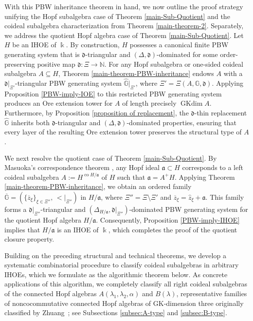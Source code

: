 \documentclass{article}
\theoremstyle{plain}
\theoremstyle{definition}
\numberwithin{equation}{section}
\newcommand{\GG}{\mathbb{G}}
\newcommand{\dd}{\mathfrak{d}}
\begin{document}
	With this PBW inheritance theorem in hand, we now outline the proof strategy unifying the Hopf subalgebra case of Theorem \ref{main-Sub-Quotient} and the coideal subalgebra characterization from Theorem \ref{main-theorem-2}. Separately, we address the quotient Hopf algebra case of Theorem \ref{main-Sub-Quotient}. Let $H$ be an IHOE of $\Bbbk$. By construction, $H$ possesses a canonical finite PBW generating system that is $\dd$-triangular and $(\Delta,\dd)$-dominated for some order-preserving positive map $\dd\colon \Xi\to \mathbb{N}$. For any Hopf subalgebra or one-sided coideal subalgebra $A\subseteq H$, Theorem \ref{main-theorem-PBW-inheritance} endows $A$ with a $\dd|_{\Xi'}$-triangular PBW generating system $\hat{\GG}|_{\Xi'}$, where $\Xi'=\Xi(A,\GG,\dd)$. Applying Proposition \ref{PBW-imply-IOE} to this restricted PBW generating system produces an Ore extension tower for $A$ of length precisely $\operatorname{GKdim} A$. Furthermore, by Proposition \ref{proposition of replacement}, the $\dd$-thin replacement $\hat{\GG}$ inherits both $\dd$-triangular and $(\Delta,\dd)$-dominated properties, ensuring that every layer of the resulting Ore extension tower preserves the structural type of $A$. 
	
	We next resolve the quotient case of Theorem \ref{main-Sub-Quotient}. By Masuoka’s correspondence theorem \cite{Ma91}, any Hopf ideal $\mathfrak{a} \subset H$ corresponds to a left coideal subalgebra $A:=H^{\operatorname{co} H/\mathfrak{a}}$ of $H$ such that $\mathfrak{a}=A^{+}H$. Applying Theorem \ref{main-theorem-PBW-inheritance}, we obtain an ordered family $\overline{\GG}=(\{\overline{z}_{\xi}\}_{\xi\in \Xi''},\,{<}|_{\Xi''})$ in $H/\mathfrak{a}$, where $\Xi''=\Xi\setminus\Xi'$ and $\overline{z}_{\xi}=\hat z_{\xi}+\mathfrak{a}$. This family forms a $\dd|_{\Xi''}$-triangular and $(\Delta_{H/\mathfrak{a}},\dd|_{\Xi''})$-dominated PBW generating system for the quotient Hopf algebra $H/\mathfrak{a}$. Consequently, Proposition \ref{PBW-imply-IHOE} implies that $H/\mathfrak{a}$ is an IHOE of $\Bbbk$, which completes the proof of the quotient closure property.
	
	
	Building on the preceding structural and technical theorems, we develop a systematic combinatorial procedure to classify coideal subalgebras in arbitrary IHOEs, which we formulate as the algorithmic theorem below.
	As concrete applications of this algorithm, we completely classify all right coideal subalgebras of the connected Hopf algebras $A(\lambda_{1},\lambda_{2},\alpha)$ and $B(\lambda)$, representative families of noncocommutative connected Hopf algebras of GK-dimension three originally classified by Zhuang~\cite{Zh13}; see Subsections \ref{subsec:A-type} and \ref{subsec:B-type}.
	
\end{document}
